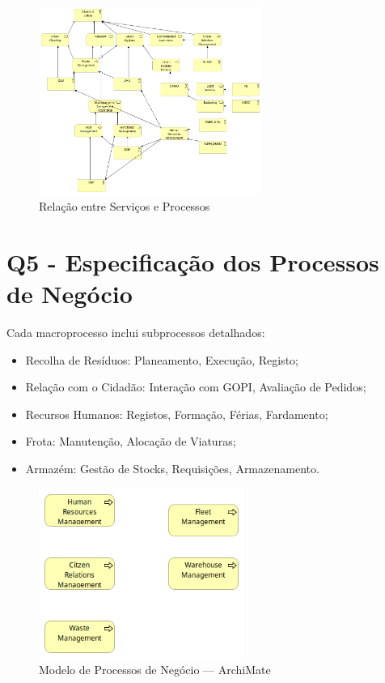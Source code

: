 \documentclass[12pt,a4paper,final]{article}
\begin{document}
    \begin{figure}[H]
        \centering
        \includegraphics[width=0.65\textwidth]{Q4 - Relation Between Business services and Business Processes}
        \caption{Relação entre Serviços e Processos}
        \label{fig:4}
    \end{figure}

    \section*{Q5 - Especificação dos Processos de Negócio}\label{sec:especificacao-dos-processos-de-negocio}
    Cada macroprocesso inclui subprocessos detalhados:
    \begin{itemize}
        \item Recolha de Resíduos: Planeamento, Execução, Registo;
        \item Relação com o Cidadão: Interação com GOPI, Avaliação de Pedidos;
        \item Recursos Humanos: Registos, Formação, Férias, Fardamento;
        \item Frota: Manutenção, Alocação de Viaturas;
        \item Armazém: Gestão de Stocks, Requisições, Armazenamento.
    \end{itemize}

    \begin{figure}[H]
        \centering
        \includegraphics[width=0.6\textwidth]{Q5 - High Level Specification of Business Process}
        \caption{Modelo de Processos de Negócio — ArchiMate}
        \label{fig:5}
    \end{figure}

    \nocite{*}
    \newpage
    \printbibliography
\end{document}
